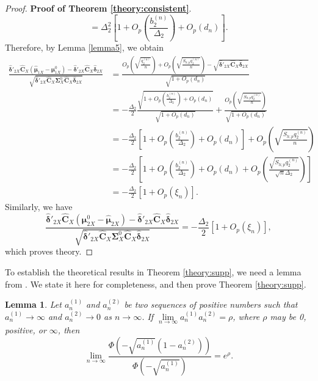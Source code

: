 \documentclass[12pt]{article}
\newtheorem{lemma}{Lemma}%
\begin{document}
\begin{proof}{\textbf{Proof of Theorem \ref{theory:consistent}}.}{}
\begin{equation*}
= \Delta_2^2 [1 + O_p(\frac{b_2^{(n)}}{\Delta_2}) + O_p(d_n)].
\end{equation*}
Therefore, by Lemma \ref{lemma5}, we obtain
\begin{align*}
\frac{\hat{\bm \delta}'_{2X} \hat{\bm C}_X (\hat{\bm \mu}_{1X} - \bm \mu_{1X}^0) - \hat{\bm \delta}'_{2X} \hat{\bm C}_X \hat{\bm \delta}_{2X} }{\sqrt{\hat{\bm \delta}'_{2X} \hat{\bm C}_X \bm \Sigma_X^0 \hat{\bm C}_X \hat{\bm \delta}_{2X} }}
&= \frac{O_p(\sqrt{\frac{q_2^{(n)}}{n}}) + O_p(\sqrt{\frac{S_{h;p} q_2^{(n)}}{n}}) - \sqrt{\hat{\bm \delta}'_{2X} \hat{\bm C}_X \hat{\bm \delta}_{2X}}}{\sqrt{1+O_p(d_n)}}   \\
&= -\frac{\Delta_2}{2} \frac{\sqrt{1 + O_p(\frac{b_2^{(n)}}{\Delta_2}) + O_p(d_n)}}{\sqrt{1 + O_p(d_n)}} + \frac{O_p(\sqrt{\frac{S_{h;p} q_2^{(n)}}{n}})}{\sqrt{1 + O_p(d_n)}}    \\
&= -\frac{\Delta_2}{2} [1 + O_p(\frac{b_2^{(n)}}{\Delta_2}) + O_p(d_n)] + O_p(\sqrt{\frac{S_{h;p} q_2^{(n)}}{n}})   \\
&= -\frac{\Delta_2}{2} [1 + O_p(\frac{b_2^{(n)}}{\Delta_2}) + O_p(d_n) + O_p(\frac{\sqrt{S_{h;p} q_2^{(n)}}}{\sqrt{n} \Delta_2})]  \\
&= -\frac{\Delta_2}{2} [1 + O_p(\xi_n)].
\end{align*}
Similarly,  we have
\begin{equation*}
\frac{\hat{\bm \delta}'_{2X} \hat{\bm C}_X (\bm \mu_{2X}^0 - \hat{\bm \mu}_{2X}) - \hat{\bm \delta}'_{2X} \hat{\bm C}_X \hat{\bm \delta}_{2X} }{\sqrt{\hat{\bm \delta}'_{2X} \hat{\bm C}_X \bm \Sigma_X^0 \hat{\bm C}_X \hat{\bm \delta}_{2X} }} = -\frac{\Delta_2}{2} [1 + O_p(\xi_n)],
\end{equation*}
which proves theory.
\end{proof}


To establish the theoretical results in Theorem \ref{theory:supp}, we need a lemma from \cite{Shao2011Sparse}.
We state it here for completeness, and then prove Theorem \ref{theory:supp}.

\begin{lemma}{}{\label{lemma1}}
Let $a_n^{(1)}$ and $a_n^{(2)}$ be two sequences of positive numbers such that
$a_n^{(1)} \rightarrow \infty$ and $a_n^{(2)} \rightarrow 0$ as $n \rightarrow \infty$.
If $\lim\limits_{n \rightarrow \infty} a_n^{(1)} a_n^{(2)} = \rho$, where $\rho$ may be 0, positive, or $\infty$, then
\begin{equation*}
\lim_{n \rightarrow \infty} \frac{\Phi(-\sqrt{a_n^{(1)}} (1-a_n^{(2)}) )}{\Phi(-\sqrt{a_n^{(1)}})} = e^{\rho}.
\end{equation*}
\end{lemma}
\end{document}
